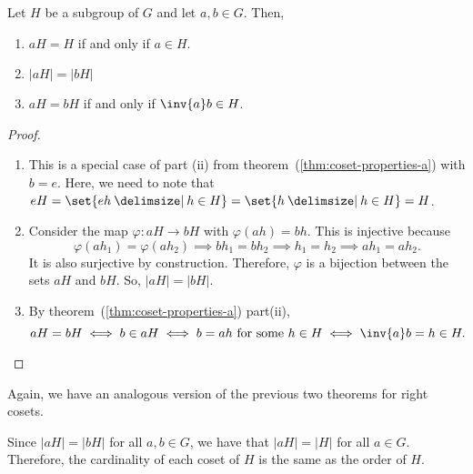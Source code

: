 \documentclass[11pt]{penrose}
\begin{document}
\begin{nthm}
    Let $H$ be a subgroup of $G$ and let $a, b \in G$. Then,
    \begin{enumerate}[label=(\roman*)]
        \item $aH = H$ if and only if $a \in H$.
        \item $|aH| = |bH|$
        \item $aH = bH$ if and only if $\inv{a} b \in H$.
    \end{enumerate}
\end{nthm}
\begin{proof}
    \begin{enumerate}[label=(\roman*)]
        \item This is a special case of part (ii) from theorem~(\ref{thm:coset-properties-a}) with $b = e$. Here, we need to note that $eH = \set{eh \st h \in H} = \set{h \st h \in H} = H$.

        \item Consider the map $\varphi : aH \to bH$ with $\varphi(ah) = bh$. This is injective because
        \begin{equation*}
            \varphi(ah_1) = \varphi(ah_2)
            \implies bh_1 = bh_2
            \implies h_1 = h_2
            \implies ah_1 = ah_2.
        \end{equation*}
        It is also surjective by construction. Therefore, $\varphi$ is a bijection between the sets $aH$ and $bH$. So, $|aH| = |bH|$.

        \item By theorem~(\ref{thm:coset-properties-a}) part(ii),
        \begin{equation*}
            aH = bH
            \iff b \in aH
            \iff b = ah \text{ for some } h \in H
            \iff \inv{a} b = h \in H.
            \qedhere
        \end{equation*}
    \end{enumerate}
\end{proof}

Again, we have an analogous version of the previous two theorems for right cosets.

\begin{remark}
    Since $|aH| = |bH|$ for all $a, b \in G$, we have that $|aH| = |H|$ for all $a \in G$. Therefore, the cardinality of each coset of $H$ is the same as the order of $H$.
\end{remark}
\end{document}
